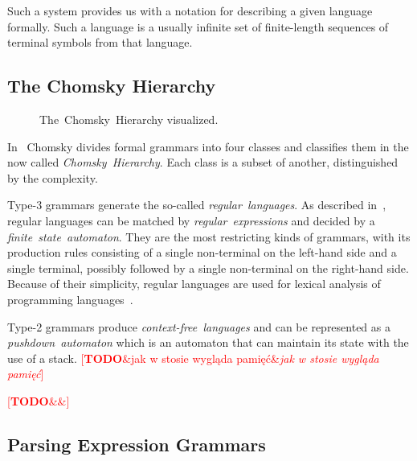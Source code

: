 \documentclass[english,engineering]{wizthesis}
\newcommand{\todo}[1]{%
  \textcolor{red}{[\textbf{TODO}\ifx&#1&{}\else{ }\fi\emph{#1}]}%
}
\begin{document}
Such a system provides us with a notation for describing a given
language formally. Such a language is a usually infinite set of finite-length
sequences of terminal symbols from that language.

\subsection{The Chomsky Hierarchy}

\begin{figure}
  \centering
  \caption{The~Chomsky~Hierarchy visualized.}
  \label{fig:chomsky-hierarchy}
\end{figure}

In~\cite{chomsky-1956} Chomsky divides formal grammars into four classes and
classifies them in the now called \emph{Chomsky~Hierarchy}. Each class is a
subset of another, distinguished by the complexity.

Type-3 grammars generate the so-called \emph{regular~languages}. As described
in~\cite{aho-1990}, regular languages can be matched by
\emph{regular~expressions} and decided by a \emph{finite~state~automaton}.
They are the most restricting kinds of grammars, with its production rules
consisting of a single non-terminal on the left-hand side and a single terminal,
possibly followed by a single non-terminal on the right-hand side. Because of
their simplicity, regular languages are used for lexical analysis of programming
languages~\cite{johnson-1968}.

Type-2 grammars produce \emph{context-free~languages} and can be represented
as a \emph{pushdown~automaton} which is an automaton that can maintain its
state with the use of a stack. \todo{jak w stosie wygląda pamięć}

\todo{\cite{hopcroft-2005,sipser-2009}}

\subsection{Parsing Expression Grammars}
\end{document}
